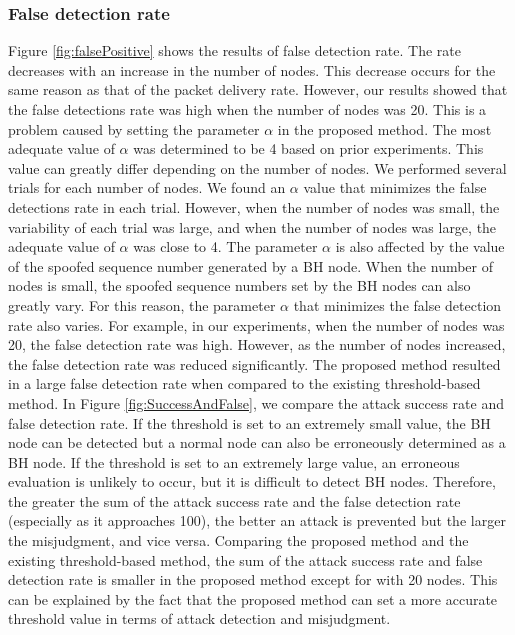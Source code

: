 \documentclass[conference]{IEEEtran}
\begin{document}
\subsubsection{False detection rate}
Figure \ref{fig:falsePositive} shows the results of false detection rate. The rate decreases with an increase in the number of nodes. This decrease occurs for the same reason as that of the packet delivery rate. However, our results showed that the false detections rate was high when the number of nodes was 20. This is a problem caused by setting the parameter $\alpha$ in the proposed method. The most adequate value of $\alpha$ was determined to be 4 based on prior experiments. This value can greatly differ depending on the number of nodes. We performed several trials for each number of nodes. We found an $\alpha$ value that minimizes the false detections rate in each trial. However, when the number of nodes was small, the variability of each trial was large, and when the number of nodes was large, the adequate value of $\alpha$ was close to 4. The parameter $\alpha$ is also affected by the value of the spoofed sequence number generated by a BH node. When the number of nodes is small, the spoofed sequence numbers set by the BH nodes can also greatly vary. For this reason, the parameter $\alpha$ that minimizes the false detection rate also varies. For example, in our experiments, when the number of nodes was 20, the false detection rate was high. However, as the number of nodes increased, the false detection rate was reduced significantly. The proposed method resulted in a large false detection rate when compared to the existing threshold-based method. In Figure \ref{fig:SuccessAndFalse}, we compare the attack success rate and false detection rate. If the threshold is set to an extremely small value, the BH node can be detected but a normal node can also be erroneously determined as a BH node. If the threshold is set to an extremely large value, an erroneous evaluation is unlikely to occur, but it is difficult to detect BH nodes. Therefore, the greater the sum of the attack success rate and the false detection rate (especially as it approaches 100), the better an attack is prevented but the larger the misjudgment, and vice versa.  Comparing the proposed method and the existing threshold-based method, the sum of the attack success rate and false detection rate is smaller in the proposed method except for with 20 nodes. This can be explained by the fact that the proposed method can set a more accurate threshold value in terms of attack detection and misjudgment.
\end{document}
